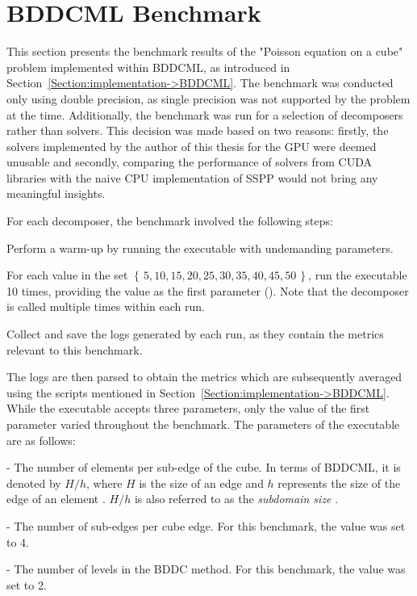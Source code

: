 \section{BDDCML Benchmark}\label{Section:comparing-decomposers-and-solvers->bddcml-benchmark}
This section presents the benchmark results of the "Poisson equation on a cube" problem implemented within BDDCML, as introduced in Section~\ref{Section:implementation->BDDCML}.
The benchmark was conducted only using double precision, as single precision was not supported by the problem at the time.
Additionally, the benchmark was run for a selection of decomposers rather than solvers.
This decision was made based on two reasons: firstly, the solvers implemented by the author of this thesis for the GPU were deemed unusable and secondly, comparing the performance of solvers from CUDA libraries with the naive CPU implementation of SSPP would not bring any meaningful insights.

For each decomposer, the benchmark involved the following steps:

\begin{tight_enumerate}
	\item Perform a warm-up by running the  executable with undemanding parameters.
	\item For each value in the set $\left\{\, 5, 10, 15, 20, 25, 30, 35, 40, 45, 50\,\right\}$, run the  executable 10 times, providing the value as the first parameter ().
Note that the decomposer is called multiple times within each run.
	\item Collect and save the logs generated by each run, as they contain the metrics relevant to this benchmark.
\end{tight_enumerate}

The logs are then parsed to obtain the metrics which are subsequently averaged using the scripts mentioned in Section~\ref{Section:implementation->BDDCML}.
While the  executable accepts three parameters, only the value of the first parameter varied throughout the benchmark.
The parameters of the executable are as follows:

\begin{tight_enumerate}
	\item {} - The number of elements per sub-edge of the cube.
In terms of BDDCML, it is denoted by $H/h$, where $H$ is the size of an edge and $h$ represents the size of the edge of an element \cite{6ZBqOb318XgFqC5W}. $H/h$ is also referred to as the \textit{subdomain size} \cite{6ZBqOb318XgFqC5W}.
	\item {} - The number of sub-edges per cube edge.
For this benchmark, the value was set to 4.
	\item {} - The number of levels in the BDDC method.
For this benchmark, the value was set to 2.
\end{tight_enumerate}


